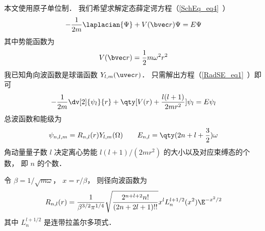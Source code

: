 
\begin{issues}
\issueDraft
\end{issues}


本文使用原子单位制． 我们希望求解定态薛定谔方程（\autoref{SchEq_eq4}~）
\begin{equation}
-\frac{1}{2m} \laplacian {\Psi} + V(\bvec r)\Psi = E \Psi
\end{equation}
其中势能函数为
\begin{equation}
V(\bvec r) = \frac{1}{2}m\omega^2 r^2
\end{equation}
我已知角向波函数是球谐函数 $Y_{l,m}(\uvec r)$． 只需解出方程（\autoref{RadSE_eq1}~）即可
\begin{equation}
-\frac{1}{2m} \dv[2]{\psi_l}{r} + \qty[V(r) + \frac{l(l + 1)}{2mr^2}]\psi_l = E\psi_l
\end{equation}
总波函数和能级为
\begin{equation}
\psi_{n,l,m} = R_{n,l}(r) Y_{l,m}(\Omega)
\qquad
E_{n,l} = \qty(2n + l + \frac32) \omega
\end{equation}    
角动量量子数 $l$ 决定离心势能 $l(l + 1)/(2mr^2)$  的大小以及对应束缚态的个数， 即 $n$ 的个数．

令 $\beta = 1/\sqrt{m\omega}$， $x = r/\beta$， 则径向波函数为
\begin{equation}
R_{n,l}(r) = \frac{1}{\beta^{3/2} \pi^{1/4}} \sqrt{\frac{2^{n+l+2} n!}{(2n + 2l + 1)!!}} x^l L_n^{l+1/2}(x^2) \E^{-x^2/2}
\end{equation}
其中 $L_n^{l+1/2}$ 是连带拉盖尔多项式．

